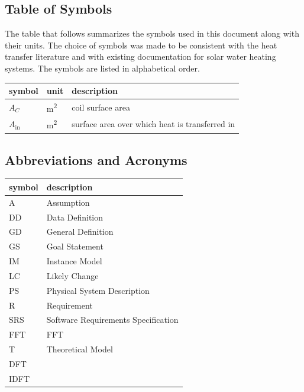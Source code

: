 \documentclass[12pt]{article}
\newcommand{\famname}{FFT} %
\begin{document}

\subsection{Table of Symbols}

The table that follows summarizes the symbols used in this document along with
their units.  The choice of symbols was made to be consistent with the heat
transfer literature and with existing documentation for solar water heating
systems.  The symbols are listed in alphabetical order.

\renewcommand{\arraystretch}{1.2}
\noindent \begin{longtable*}{l l p{12cm}} \toprule
\textbf{symbol} & \textbf{unit} & \textbf{description}\\
\midrule 
$A_C$ & \si[per-mode=symbol] {\square\metre} & coil surface area
\\
$A_\text{in}$ & \si[per-mode=symbol] {\square\metre} & surface area over 
which heat is transferred in
\\ 
\bottomrule
\end{longtable*}

\subsection{Abbreviations and Acronyms}

\renewcommand{\arraystretch}{1.2}
\begin{tabular}{l l} 
  \toprule		
  \textbf{symbol} & \textbf{description}\\
  \midrule 
  A & Assumption\\
  DD & Data Definition\\
  GD & General Definition\\
  GS & Goal Statement\\
  IM & Instance Model\\
  LC & Likely Change\\
  PS & Physical System Description\\
  R & Requirement\\
  SRS & Software Requirements Specification\\
  \famname{} & FFT\\
  T & Theoretical Model\\
  DFT & \\
  IDFT & \\
  \bottomrule
\end{tabular}\\
\end{document}
